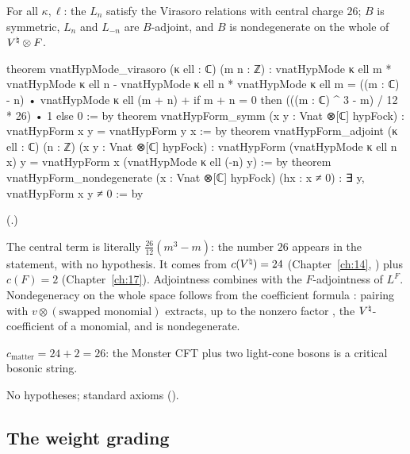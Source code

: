 \begin{theorem}\label{ch18:thm:sectorlaws}
For all $\kappa,\ell$: the $L_n$ satisfy the Virasoro relations with central charge $26$; $B$ is symmetric,
$L_n$ and $L_{-n}$ are $B$-adjoint, and $B$ is nondegenerate on the whole of ${V^{\natural}}\otimes F$.
\end{theorem}
\begin{leancode}
theorem vnatHypMode_virasoro (κ ell : ℂ) (m n : ℤ) :
    vnatHypMode κ ell m * vnatHypMode κ ell n -
      vnatHypMode κ ell n * vnatHypMode κ ell m =
      ((m : ℂ) - n) • vnatHypMode κ ell (m + n) +
        if m + n = 0 then (((m : ℂ) ^ 3 - m) / 12 * 26) • 1 else 0 := by
theorem vnatHypForm_symm (x y : Vnat ⊗[ℂ] hypFock) : vnatHypForm x y = vnatHypForm y x := by
theorem vnatHypForm_adjoint (κ ell : ℂ) (n : ℤ) (x y : Vnat ⊗[ℂ] hypFock) :
    vnatHypForm (vnatHypMode κ ell n x) y = vnatHypForm x (vnatHypMode κ ell (-n) y) := by
theorem vnatHypForm_nondegenerate (x : Vnat ⊗[ℂ] hypFock) (hx : x ≠ 0) :
    ∃ y, vnatHypForm x y ≠ 0 := by
\end{leancode}
(.)
\begin{dictionary}
The central term  is literally $\frac{26}{12}(m^3-m)$: the
number $26$ appears in the statement, with no hypothesis.  It comes from $c({V^{\natural}})=24$ (Chapter~\ref{ch:14},
) plus $c(F)=2$ (Chapter~\ref{ch:17}).  Adjointness combines
 with the $F$-adjointness of $L^F$.  Nondegeneracy on the whole space
follows from the coefficient formula : pairing with $v\otimes(\text{swapped
monomial})$ extracts, up to the nonzero factor , the ${V^{\natural}}$-coefficient of a
monomial, and  is nondegenerate.
\end{dictionary}
\begin{physics}
$c_{\text{matter}}=24+2=26$: the Monster CFT plus two light-cone bosons is a critical bosonic string.
\end{physics}
\begin{status}No hypotheses; standard axioms ().\end{status}

\subsection{The weight grading}

